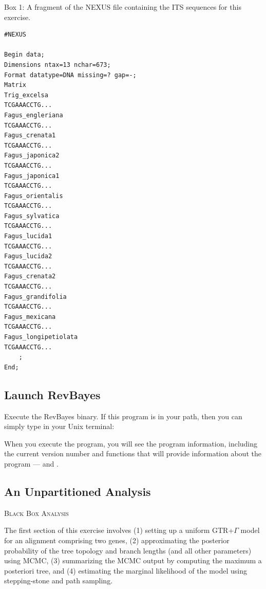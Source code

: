 \begin{center}
Box 1: A fragment of the NEXUS file containing the ITS sequences for this exercise. \\
\end{center}
{\tt \scriptsize \begin{framed}
\begin{lstlisting}
#NEXUS 

Begin data;
Dimensions ntax=13 nchar=673;
Format datatype=DNA missing=? gap=-;
Matrix
Trig_excelsa   
TCGAAACCTG...
Fagus_engleriana   
TCGAAACCTG...
Fagus_crenata1   
TCGAAACCTG...
Fagus_japonica2   
TCGAAACCTG...
Fagus_japonica1   
TCGAAACCTG...
Fagus_orientalis   
TCGAAACCTG...
Fagus_sylvatica   
TCGAAACCTG...
Fagus_lucida1   
TCGAAACCTG...
Fagus_lucida2   
TCGAAACCTG...
Fagus_crenata2   
TCGAAACCTG...
Fagus_grandifolia   
TCGAAACCTG...
Fagus_mexicana   
TCGAAACCTG...
Fagus_longipetiolata   
TCGAAACCTG...
	;
End;
\end{lstlisting}
\end{framed}}




\bigskip
\subsection{Launch RevBayes}

Execute the RevBayes binary. If this program is in your path, then you can simply type in your Unix terminal:


When you execute the program, you will see the program information, including the current version number and functions that will provide information about the program ---  and . 




\bigskip
\subsection{An Unpartitioned Analysis}\label{secUnif} 

{\large \textcolor{mycol}{\textsc{Black Box Analysis}}}

The first section of this exercise involves 
(1) setting up a uniform GTR+$\Gamma$ model for an alignment comprising two genes, 
(2) approximating the posterior probability of the tree topology and branch lengths (and all other parameters) using MCMC,  
(3) summarizing the MCMC output by computing the maximum a posteriori tree, and
(4) estimating the marginal likelihood of the model using stepping-stone and path sampling. 

